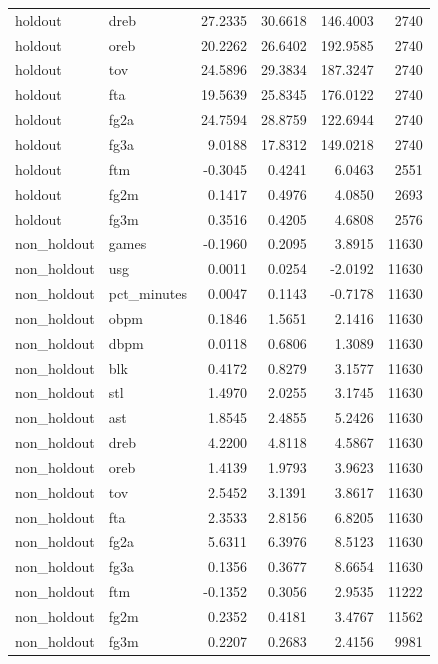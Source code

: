 \begin{table}
\begin{tabular}{llrrrr}
holdout & dreb & 27.2335 & 30.6618 & 146.4003 & 2740 \\
holdout & oreb & 20.2262 & 26.6402 & 192.9585 & 2740 \\
holdout & tov & 24.5896 & 29.3834 & 187.3247 & 2740 \\
holdout & fta & 19.5639 & 25.8345 & 176.0122 & 2740 \\
holdout & fg2a & 24.7594 & 28.8759 & 122.6944 & 2740 \\
holdout & fg3a & 9.0188 & 17.8312 & 149.0218 & 2740 \\
holdout & ftm & -0.3045 & 0.4241 & 6.0463 & 2551 \\
holdout & fg2m & 0.1417 & 0.4976 & 4.0850 & 2693 \\
holdout & fg3m & 0.3516 & 0.4205 & 4.6808 & 2576 \\
non\_holdout & games & -0.1960 & 0.2095 & 3.8915 & 11630 \\
non\_holdout & usg & 0.0011 & 0.0254 & -2.0192 & 11630 \\
non\_holdout & pct\_minutes & 0.0047 & 0.1143 & -0.7178 & 11630 \\
non\_holdout & obpm & 0.1846 & 1.5651 & 2.1416 & 11630 \\
non\_holdout & dbpm & 0.0118 & 0.6806 & 1.3089 & 11630 \\
non\_holdout & blk & 0.4172 & 0.8279 & 3.1577 & 11630 \\
non\_holdout & stl & 1.4970 & 2.0255 & 3.1745 & 11630 \\
non\_holdout & ast & 1.8545 & 2.4855 & 5.2426 & 11630 \\
non\_holdout & dreb & 4.2200 & 4.8118 & 4.5867 & 11630 \\
non\_holdout & oreb & 1.4139 & 1.9793 & 3.9623 & 11630 \\
non\_holdout & tov & 2.5452 & 3.1391 & 3.8617 & 11630 \\
non\_holdout & fta & 2.3533 & 2.8156 & 6.8205 & 11630 \\
non\_holdout & fg2a & 5.6311 & 6.3976 & 8.5123 & 11630 \\
non\_holdout & fg3a & 0.1356 & 0.3677 & 8.6654 & 11630 \\
non\_holdout & ftm & -0.1352 & 0.3056 & 2.9535 & 11222 \\
non\_holdout & fg2m & 0.2352 & 0.4181 & 3.4767 & 11562 \\
non\_holdout & fg3m & 0.2207 & 0.2683 & 2.4156 & 9981 \\
\bottomrule
\end{tabular}
\end{table}
